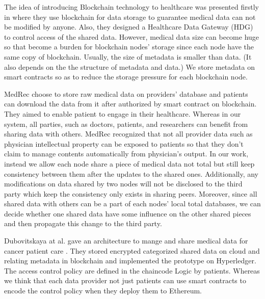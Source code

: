 \documentclass[conference]{IEEEtran}
\begin{document}
The idea of introducing Blockchain technology to healthcare was presented firstly in \cite{yue2016healthcare} where they use blockchain for data storage to guarantee medical data can not be modified by anyone. Also, they designed a Healthcare Data Gateway (HDG) to control access of the shared data. However, medical data size can become huge so that become a burden for blockchain nodes' storage since each node have the same copy of blockchain. Usually, the size of metadata is smaller than data. (It also depends on the the structure of metadata and data.) We store metadata on smart contracts so as to reduce the storage pressure for each blockchain node.

MedRec \cite{azaria2016medrec} choose to store raw medical data on providers' database and patients can download the data from it after authorized by smart contract on blockchain. They aimed to enable patient to engage in their healthcare. Whereas in our system, all parties, such as doctors, patients, and researchers can benefit from sharing data with others. MedRec recognized that not all provider data such as physician intellectual property can be exposed to patients \cite{us2017individuals, grossman2011clinical} so that they don't claim to manage contents automatically from physician's output. In our work, instead we allow each node share a piece of medical data not total but still keep consistency between them after the updates to the shared ones. Additionally, any modifications on data shared by two nodes will not be disclosed to the third party which keep the consistency only exists in sharing peers. Moreover, since all shared data with others can be a part of each nodes' local total databases, we can decide whether one shared data have some influence on the other shared pieces and then propagate this change to the third party.

Dubovitskaya at al. gave an architecture to mange and share medical data for cancer patient care \cite{dubovitskaya2017secure}. They stored encrypted categorized shared data on cloud and relating metadata in blockchain and implemented the prototype on Hyperledger\cite{hyperledger2017hyperledger}. The access control policy are defined in the chaincode Logic by patients. Whereas we think that each data provider not just patients can use smart contracts to encode the control policy when they deploy them to Ethereum. 
\end{document}
